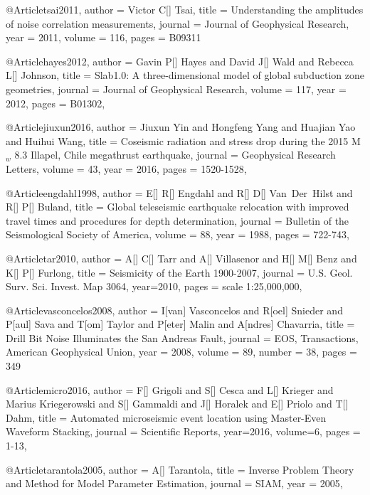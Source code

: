 @Article{tsai2011,
  author = 	 {Victor C[] Tsai},
  title = 	 {Understanding the amplitudes of noise correlation measurements},
  journal = 	 {Journal of Geophysical Research},
  year = 	 2011,
  volume = 116,
  pages =	 {B09311}
}

@Article{hayes2012,
  author =	 { Gavin P[] Hayes and David J[] Wald and Rebecca L[] Johnson},
  title =	 {Slab1.0: A three-dimensional model of global subduction zone geometries},
  journal =	 {Journal of Geophysical Research},
  volume =	 117,
  year =	 2012,
  pages =	 {B01302},
}

@Article{jiuxun2016,
  author =	 { Jiuxun Yin and Hongfeng Yang and Huajian Yao and Huihui Wang},
  title =	 {Coseismic radiation and stress drop during the 2015 {M}$_w$ 8.3 {I}llapel, {C}hile megathrust earthquake},
  journal =	 {Geophysical Research Letters},
  volume =	 43,
  year =	 2016,
  pages =	 {1520-1528},
}

@Article{engdahl1998,
  author =	 {E[] R[] Engdahl and R[] D[]  Van~Der~Hilst and R[] P[] Buland},
  title =	 {Global teleseismic earthquake relocation with improved travel times and procedures for depth determination},
  journal =	 {Bulletin of the Seismological Society of America},
  volume =	 88,
  year =	 1988,
  pages =	 {722-743},
}

@Article{tar2010,
  author =	 {A[] C[] Tarr and A[] Villasenor and H[] M[] Benz and K[] P[] Furlong},
  title =	 {Seismicity of the {E}arth 1900-2007},
  journal =	 {U.S. Geol. Surv. Sci. Invest. Map 3064},
  year=2010,
  pages =	 {scale 1:25,000,000},
}

@Article{vasconcelos2008,
   author = { I[van] Vasconcelos and R[oel] Snieder and P[aul] Sava and T[om] Taylor and P[eter] Malin and A[ndres] Chavarria},
   title = {Drill Bit Noise Illuminates the {S}an {A}ndreas Fault},
   journal = {{EOS}, {T}ransactions, {A}merican {G}eophysical {U}nion},
   year = {2008},
   volume = {89},
   number = {38},
   pages = {349}
}

@Article{micro2016,
  author =	 {F[] Grigoli and S[] Cesca and L[] Krieger and Marius Kriegerowski and S[] Gammaldi and J[] Horalek and E[] Priolo and T[] Dahm},
  title =	 {Automated microseismic event location using Master-Even Waveform Stacking},
  journal =	 {Scientific Reports},
  year=2016,
  volume=6,
  pages =	 {1-13},
}





@Article{tarantola2005,
  author = 	 {A[] Tarantola},
  title = 	 {Inverse Problem Theory and Method for Model Parameter Estimation},
  journal = 	 {SIAM},
  year = 	 2005,
}







